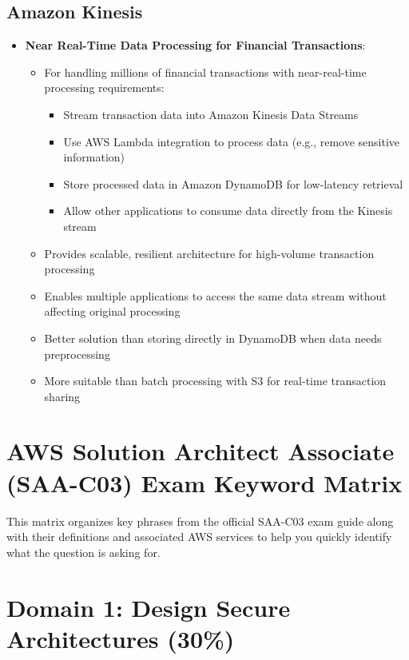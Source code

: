 \documentclass[11pt,a4paper]{report}
\begin{document}
\section{Amazon Kinesis}

\begin{itemize}
  \item \textbf{Near Real-Time Data Processing for Financial Transactions}:
\begin{itemize}
  \item For handling millions of financial transactions with near-real-time processing requirements:
\begin{itemize}
  \item Stream transaction data into Amazon Kinesis Data Streams
  \item Use AWS Lambda integration to process data (e.g., remove sensitive information)
  \item Store processed data in Amazon DynamoDB for low-latency retrieval
  \item Allow other applications to consume data directly from the Kinesis stream
\end{itemize}
  \item Provides scalable, resilient architecture for high-volume transaction processing
  \item Enables multiple applications to access the same data stream without affecting original processing
  \item Better solution than storing directly in DynamoDB when data needs preprocessing
  \item More suitable than batch processing with S3 for real-time transaction sharing
\end{itemize}
\end{itemize}





\chapter{AWS Solution Architect Associate (SAA-C03) Exam Keyword Matrix}


This matrix organizes key phrases from the official SAA-C03 exam guide along with their definitions and associated AWS services to help you quickly identify what the question is asking for.



\chapter{Domain 1: Design Secure Architectures (30\%)}
\end{document}
